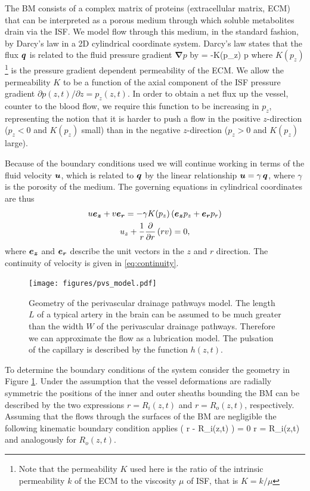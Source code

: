 \documentclass[a4paper,titlepage]{scrartcl}
\begin{document}
The BM consists of a complex matrix of proteins (extracellular matrix, ECM) that can be interpreted as a porous medium through which soluble metabolites drain via the ISF. We model flow through this medium, in the standard fashion, by Darcy's law in a 2D cylindrical coordinate system. Darcy's law states that the flux $\boldsymbol{q}$ is related to the fluid pressure gradient $\boldsymbol{\nabla} p$ by
\beq\label{eq:darcy}
  \q = -K(p_z) \boldsymbol{\nabla} p
\eeq
where $K(p_z)$\footnote{Note that the permeability $K$ used here is the ratio of the intrinsic permeability $k$ of the ECM to the viscosity $\mu$ of ISF, that is $K = k / \mu$} is the pressure gradient dependent permeability of the ECM. We allow the permeability $K$ to be a function of the axial component of the ISF pressure gradient $\partial p(z,t) / \partial z = p_z(z,t)$. In order to obtain a net flux up the vessel, counter to the blood flow, we require this function to be increasing in $p_z$, representing the notion that it is harder to push a flow in the positive $z$-direction ($p_z<0$ and $K(p_z)$ small) than in the negative $z$-direction ($p_z>0$ and $K(p_z)$ large).

Because of the boundary conditions used we will continue working in terms of the fluid velocity $\boldsymbol{u}$, which is related to $\boldsymbol{q}$ by the linear relationship $\boldsymbol{u} = \gamma \, \boldsymbol{q}$, where $\gamma$ is the porosity of the medium. The governing equations in cylindrical coordinates are thus
\begin{gather}
  u \boldsymbol{e_z} + v \boldsymbol{e_r} = - \gamma K(p_z) \left( \boldsymbol{e_z} p_z + \boldsymbol{e_r} p_r \right) \label{eq:darcy_velocity}\\
  u_z + \frac{1}{r} \frac{\partial}{\partial r} \left( r v \right) = 0 \label{eq:continuity},
\end{gather}
where $\boldsymbol{e_z}$ and $\boldsymbol{e_r}$ describe the unit vectors in the $z$ and $r$ direction. The continuity of velocity is given in \eqref{eq:continuity}.

\begin{figure}
\centerline{\texttt{[image: figures/pvs\_model.pdf]}}
\caption{Geometry of the perivascular drainage pathways model. The length $L$ of a typical artery in the brain can be assumed to be much greater than the width $W$ of the perivascular drainage pathways. Therefore we can approximate the flow as a lubrication model. The pulsation of the capillary is described by the function $h(z,t)$.\label{fig:pvs_model}}
\end{figure}

To determine the boundary conditions of the system consider the geometry in Figure \ref{fig:pvs_model}. Under the assumption that the vessel deformations are radially symmetric the positions of the inner and outer sheaths bounding the BM can be described by the two expressions $r = R_i(z,t)$ and $r = R_o(z,t)$, respectively. Assuming that the flows through the surfaces of the BM are negligible the following kinematic boundary condition applies
\beq \label{eq:kinematic}  
 \left( r - R_i(z,t) \right) = 0 \quad {} r = R_i(z,t)
\eeq
and analogously for $R_o(z,t)$.
\end{document}
